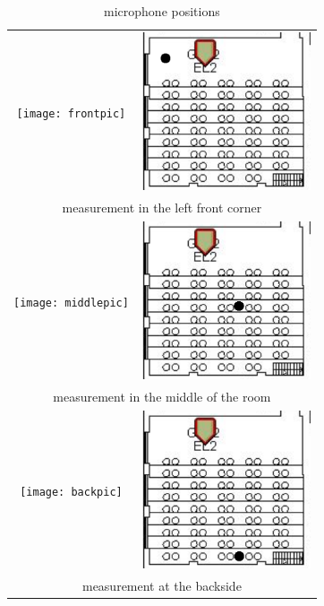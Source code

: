 \documentclass{article}
\begin{document}
\begin{table}
\begin{center}
\begin{tabular}{|c c|}
\hline
\texttt{[image: frontpic]} & \includegraphics[width=5cm,keepaspectratio=true]{front}\\
\multicolumn{2}{|c|}{measurement in the left front corner}\\
\hline
\texttt{[image: middlepic]} & \includegraphics[width=5cm,keepaspectratio=true]{middle}\\
\multicolumn{2}{|c|}{measurement in the middle of the room}\\
\hline
\texttt{[image: backpic]} & \includegraphics[width=5cm,keepaspectratio=true]{back}\\
\multicolumn{2}{|c|}{measurement at the backside}\\
\hline
\end{tabular}
\caption{microphone positions}
\label{tab:revmeasure}
\end{center}
\end{table}
\end{document}

